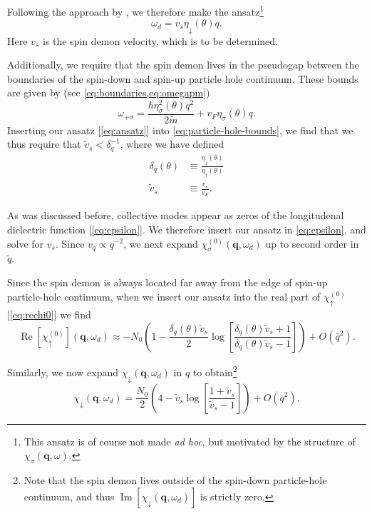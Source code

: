 \documentclass[aps,prb,reprint,twocolumns,superscriptaddress,nofootinbib]{revtex4-2}
\DeclareMathOperator{\Imm}{Im}
\DeclareMathOperator{\Ree}{Re}
\newcommand{\mdos}{\tilde{m}}
\begin{document}
	Following the approach by \textcite{santoroAcousticPlasmonsConducting1988}, we therefore make the ansatz\footnote{This ansatz is of course not made \emph{ad hoc}, but motivated by the structure of $\chi_\sigma(\bm q,\omega)$.}  
	\begin{equation}
	\omega_d = v_s \eta_{\downarrow}(\theta)q. \label{eq:ansatz}
	\end{equation}
	Here $v_s$ is the spin demon velocity, which is to be determined.
	
	
	Additionally, we require that the spin demon lives in the pseudogap between the boundaries of the spin-down and spin-up particle hole continuum. These bounds are given by (see \cref{eq:boundaries,eq:omegapm})
	\begin{equation}
		\omega_{+\sigma} = \frac{\hbar\eta_\sigma^2(\theta) q^2}{2\mdos} + v_F  \eta_\sigma(\theta) q. \label{eq:particle-hole-bounds}
	\end{equation}
	Inserting our ansatz [\cref{eq:ansatz}] into \cref{eq:particle-hole-bounds}, we find that we thus require that $\tilde v_s < \delta_q^{-1}$, where we have defined
		\begin{align}
		\delta_q(\theta)&\equiv \frac{\eta_\downarrow(\theta)}{\eta_\uparrow(\theta)} \\
		\tilde v_s&\equiv  \frac{v_s}{v_F}.
	\end{align}
	
	As was discussed before, collective modes appear as zeros of the longitudenal dielectric function [\cref{eq:epsilon}]. We therefore insert our ansatz in \cref{eq:epsilon}, and solve for $v_s$. Since $v_q\propto q^{-2}$, we next expand  $\chi_\sigma^{(0)}(\bm q,\omega_d)$ up to second order in $\tilde q$.
	
	Since the spin demon is always located far away from the edge of spin-up particle-hole continuum, when we insert our ansatz into the real part of $\chi_\uparrow^{(0)}$ [\cref{eq:rechi0}] we find
	\begin{equation}
		\Ree[\chi_\uparrow^{(0)}](\bm q,\omega_d) \approx -N_0\left(1-\frac{\delta_q(\theta) \tilde v_s}{2}\log\left[\frac{\delta_q(\theta) \tilde v_s+1}{\delta_q(\theta) \tilde v_s-1}\right]\right) + O\left(\bar q^2\right) \label{eq:chiup-expanded}.
	\end{equation} 



	
	 Similarly, we now expand $\chi_\downarrow(\bm q,\omega_d)$ in $q$ to obtain\footnote{Note that the spin demon lives outside of the spin-down particle-hole continuum, and thus $\Imm[\chi_\downarrow(\bm q,\omega_d)]$ is strictly zero.}
	 \begin{equation}
	 	\chi_\downarrow(\bm q,\omega_d) = \frac{N_0}{2}\left(4-\tilde v_s\log \left[ \frac{1+\tilde v_s}{\tilde v_s-1} \right]\right) + O\left(\bar q^2\right) \label{eq:chidown-expanded}.
	 \end{equation}
\end{document}
